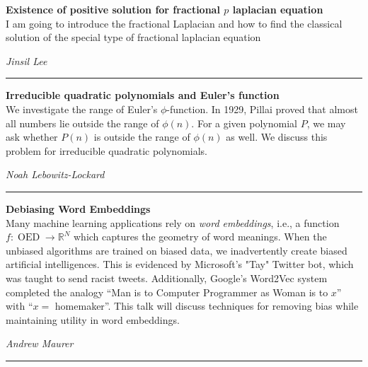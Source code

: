 \documentclass[oneside]{amsart}
\begin{document}
\filbreak
\hspace{-20pt}\textbf{ \textbf{ Existence of positive solution for fractional $p$ laplacian equation } } \vspace{0.5em}\\
I am going to introduce the fractional Laplacian and how to find the classical solution of the special type of fractional laplacian equation \vspace{-1em}\\
\begin{flushright} \textit{ Jinsil Lee } \vspace{0.5em} \end{flushright}
\rule{\textwidth}{0.4pt}
\vspace{0.5em}

\filbreak
\hspace{-20pt}\textbf{ \textbf{ Irreducible quadratic polynomials and Euler's function } } \vspace{0.5em}\\
We investigate the range of Euler's $\phi$-function. In 1929, Pillai proved that almost all numbers lie outside the range of $\phi(n)$. For a given polynomial $P$, we may ask whether $P(n)$ is outside the range of $\phi(n)$ as well. We discuss this problem for irreducible quadratic polynomials. \vspace{-1em}\\
\begin{flushright} \textit{ Noah Lebowitz-Lockard } \vspace{0.5em} \end{flushright}
\rule{\textwidth}{0.4pt}
\vspace{0.5em}

\filbreak
\hspace{-20pt}\textbf{ \textbf{ Debiasing Word Embeddings } } \vspace{0.5em}\\
Many machine learning applications rely on \emph{word embeddings}, i.e., a function $f: \operatorname{OED} \to \mathbb{R}^N$ which captures the geometry of word meanings. When the unbiased algorithms are trained on biased data, we inadvertently create biased artificial intelligences. This is evidenced by Microsoft's "Tay" Twitter bot, which was taught to send racist tweets. Additionally, Google's Word2Vec system completed the analogy ``Man is to Computer Programmer as Woman is to $x$'' with ``$x =$ homemaker''. This talk will discuss techniques for removing bias while maintaining utility in word embeddings. \vspace{-1em}\\
\begin{flushright} \textit{ Andrew Maurer } \vspace{0.5em} \end{flushright}
\rule{\textwidth}{0.4pt}
\vspace{0.5em}
\end{document}
